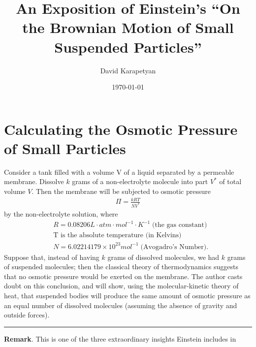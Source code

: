 \documentclass[12pt,reqno]{amsart}
\theoremstyle{plain}  %
\theoremstyle{definition}
\begin{document}
\title{An Exposition of Einstein's ``On the Brownian Motion of Small Suspended
  Particles''}
\author{David Karapetyan }
\address{Department of Mathematics  \\
  University  of Notre Dame\\
  Notre Dame, IN 46556 }
\date{\today}
%
\maketitle
%
%
\parindent0in
\parskip0.1in
%
%
%
%
\section{Calculating the Osmotic Pressure of Small Particles}
\setcounter{equation}{0}
Consider a tank filled with a volume V of a liquid separated by a
permeable membrane. Dissolve $k$ grams of a non-electrolyte molecule
into part $V^*$ of total volume $V$. Then the membrane will be
subjected to osmotic pressure 
\begin{equation*}
  \begin{split}
    \Pi = \frac{kRT}{NV^*}
    \label{osmotic-pressure}
  \end{split}
\end{equation*}
by the non-electrolyte solution, where
\begin{equation*}
  \begin{split}
    & R = 0.08206 L \cdot atm \cdot mol^{-1} \cdot K^{-1}
    \; \text{(the gas constant)} 
    \\
    & \text{T is the absolute temperature (in Kelvins)}
    \\
    & N = 6.02214179 \times 10^{23} mol^{-1} \; \text{(Avogadro's
      Number)}.
    \label{osmotic-pressure-symbols}
  \end{split}
\end{equation*}
Suppose that, instead of having $k$ grams of dissolved molecules, we had $k$ grams of
suspended molecules; then the classical theory of thermodynamics suggests that no
osmotic pressure would be exerted on the membrane. The author casts doubt on this
conclusion, and will show, using the molecular-kinetic theory of heat, that suspended
bodies will produce the same amount of osmotic pressure as an equal number of dissolved
molecules (assuming the absence of gravity and outside forces).
\\
\hrule
{\bf Remark}. This is one of the three extraordinary insights Einstein includes in
\end{document}
